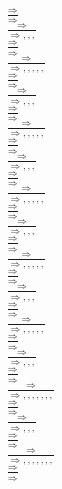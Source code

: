 \documentclass[11pt]{article}
\begin{document}
\begin{center}
\bigskip
\\$\frac{\Rightarrow }{\Rightarrow }$
\bigskip
\\$\frac{\Rightarrow }{\Rightarrow , , , }$
\bigskip
\\$\frac{\Rightarrow }{\Rightarrow }$
\bigskip
\\$\frac{\Rightarrow }{\Rightarrow , , , , , }$
\bigskip
\\$\frac{\Rightarrow }{\Rightarrow }$
\bigskip
\\$\frac{\Rightarrow }{\Rightarrow , , , }$
\bigskip
\\$\frac{\Rightarrow }{\Rightarrow }$
\bigskip
\\$\frac{\Rightarrow }{\Rightarrow , , , , , }$
\bigskip
\\$\frac{\Rightarrow }{\Rightarrow }$
\bigskip
\\$\frac{\Rightarrow }{\Rightarrow , , , }$
\bigskip
\\$\frac{\Rightarrow }{\Rightarrow }$
\bigskip
\\$\frac{\Rightarrow }{\Rightarrow , , , , , }$
\bigskip
\\$\frac{\Rightarrow }{\Rightarrow }$
\bigskip
\\$\frac{\Rightarrow }{\Rightarrow , , , }$
\bigskip
\\$\frac{\Rightarrow }{\Rightarrow }$
\bigskip
\\$\frac{\Rightarrow }{\Rightarrow , , , , , }$
\bigskip
\\$\frac{\Rightarrow }{\Rightarrow }$
\bigskip
\\$\frac{\Rightarrow }{\Rightarrow , , , }$
\bigskip
\\$\frac{\Rightarrow }{\Rightarrow }$
\bigskip
\\$\frac{\Rightarrow }{\Rightarrow , , , , , }$
\bigskip
\\$\frac{\Rightarrow }{\Rightarrow }$
\bigskip
\\$\frac{\Rightarrow }{\Rightarrow , , , }$
\bigskip
\\$\frac{\Rightarrow }{\Rightarrow }$
\bigskip
\\$\frac{\Rightarrow }{\Rightarrow , , , , , , , }$
\bigskip
\\$\frac{\Rightarrow }{\Rightarrow }$
\bigskip
\\$\frac{\Rightarrow }{\Rightarrow , , , }$
\bigskip
\\$\frac{\Rightarrow }{\Rightarrow }$
\bigskip
\\$\frac{\Rightarrow }{\Rightarrow , , , , , , , }$
\bigskip
\\$\frac{\Rightarrow }{\Rightarrow }$

\end{center}
\end{document}
